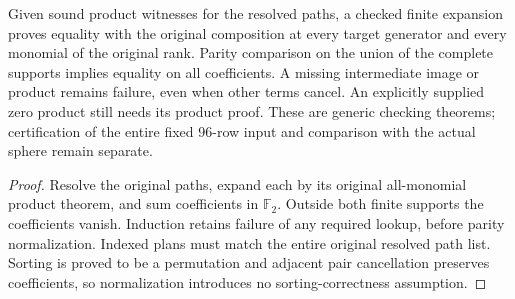 \begin{lemma}
  \label{lem:lin-secondary-certified-expansion}
  \leanok
  Given sound product witnesses for the resolved paths, a checked finite
  expansion proves equality with the original composition at every target
  generator and every monomial of the original rank. Parity comparison on
  the union of the complete supports implies equality on all coefficients.
  A missing intermediate image or product remains failure, even when other
  terms cancel. An explicitly supplied zero product still needs its product
  proof. These are generic checking theorems; certification of the entire
  fixed 96-row input and comparison with the actual sphere remain separate.
\end{lemma}
\begin{proof}
  \leanok
  Resolve the original paths, expand each by its original all-monomial
  product theorem, and sum coefficients in $\mathbb F_2$. Outside both
  finite supports the coefficients vanish. Induction retains failure of
  any required lookup, before parity normalization. Indexed plans must match
  the entire original resolved path list. Sorting is proved to be a permutation
  and adjacent pair cancellation preserves coefficients, so normalization
  introduces no sorting-correctness assumption.
\end{proof}

